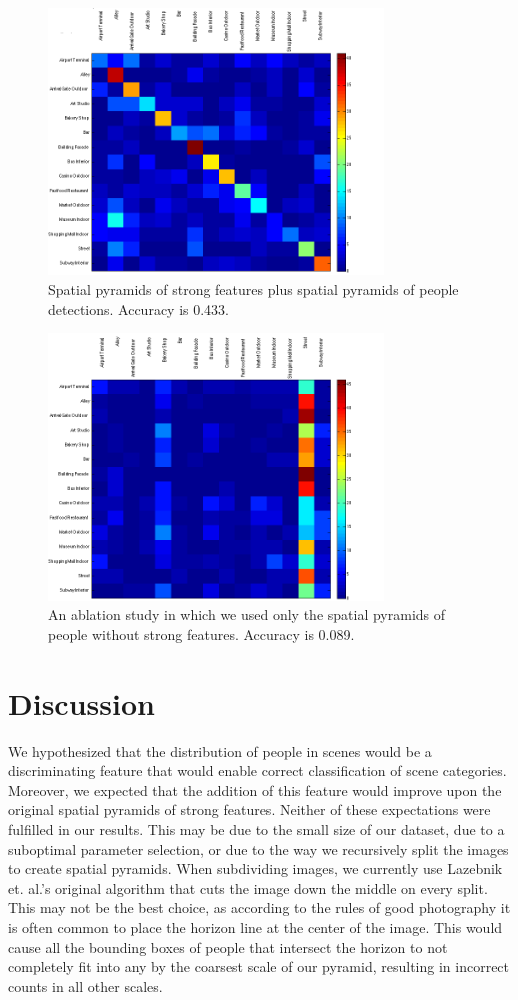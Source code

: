 \documentclass[11pt]{article}
\begin{document}
\begin{figure}[p]
 \centering
\includegraphics[width=3.5in]{images/Pyramid_poselets_and_strong_features.png}
 \caption{Spatial pyramids of strong features plus spatial pyramids of people detections. Accuracy is 0.433.}
 \label{fig:pyramid_poselets_strong}
\end{figure}

\begin{figure}[p]
 \centering
\includegraphics[width=3.5in]{images/pyramid_poselets_only.png}
 \caption{An ablation study in which we used only the spatial pyramids of people without strong features. Accuracy is 0.089.}
 \label{fig:pyramid_poselets_only}
\end{figure}

\section{Discussion}

We hypothesized that the distribution of people in scenes would be a discriminating feature that would enable correct classification of scene categories. Moreover, we expected that the addition of this feature would improve upon the original spatial pyramids of strong features. Neither of these expectations were fulfilled in our results. This may be due to the small size of our dataset, due to a suboptimal parameter selection, or due to the way we recursively split the images to create spatial pyramids. When subdividing images, we currently use Lazebnik et. al.'s original algorithm that cuts the image down the middle on every split. This may not be the best choice, as according to the rules of good photography it is often common to place the horizon line at the center of the image. This would cause all the bounding boxes of people that intersect the horizon to not completely fit into any by the coarsest scale of our pyramid, resulting in incorrect counts in all other scales.
\end{document}

